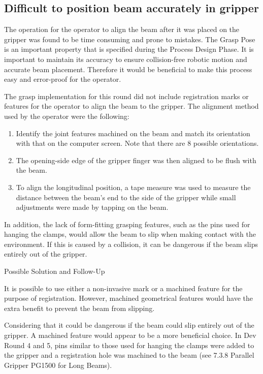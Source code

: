 \subsection{Difficult to position beam accurately in gripper}
The operation for the operator to align the beam after it was placed on the gripper was found to be time consuming and prone to mistakes. The Grasp Pose is an important property that is specified during the Process Design Phase. It is important to maintain its accuracy to ensure collision-free robotic motion and accurate beam placement. Therefore it would be beneficial to make this process easy and error-proof for the operator.

The grasp implementation for this round did not include registration marks or features for the operator to align the beam to the gripper. The alignment method used by the operator were the following:

\begin{enumerate}
    \item Identify the joint features machined on the beam and match its orientation with that on the computer screen. Note that there are 8 possible orientations.
    \item The opening-side edge of the gripper finger was then aligned to be flush with the beam.
    \item To align the longitudinal position, a tape measure was used to measure the distance between the beam’s end to the side of the gripper while small adjustments were made by tapping on the beam. 
\end{enumerate}

In addition, the lack of form-fitting grasping features, such as the pins used for hanging the clamps, would allow the beam to slip when making contact with the environment. If this is caused by a collision, it can be dangerous if the beam slips entirely out of the gripper.

Possible Solution and Follow-Up

It is possible to use either a non-invasive mark or a machined feature for the purpose of registration. However, machined geometrical features would have the extra benefit to prevent the beam from slipping. 

Considering that it could be dangerous if the beam could slip entirely out of the gripper. A machined feature would appear to be a more beneficial choice. In Dev Round 4 and 5, pins similar to those used for hanging the clamps were added to the gripper and a registration hole was machined to the beam (see 7.3.8 Parallel Gripper PG1500 for Long Beams).

